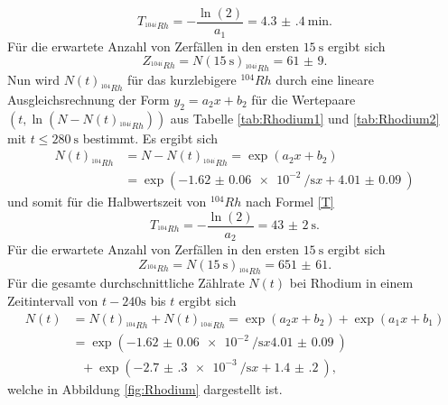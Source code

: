 \begin{equation}
	T_{^{104i}Rh} = -\frac{\ln(2)}{a_1}=\SI{4.3(4)}{\minute}\text{.}
\end{equation}
Für die erwartete Anzahl von Zerfällen in den ersten $\SI{15}{\second}$ ergibt sich
\begin{equation}
	Z_{^{104i}Rh} = N(\SI{15}{\second})_{^{104i}Rh}=\num{61(9)}\text{.}
\end{equation}
Nun wird $N(t)_{^{104}Rh}$ für das kurzlebigere $^{104} Rh$ durch eine lineare Ausgleichsrechnung der Form $y_2=a_2 x+b_2$ für die Wertepaare $(t,\ln(N-N(t)_{^{104i}Rh}))$ aus Tabelle \ref{tab:Rhodium1} und \ref{tab:Rhodium2}  mit $t\le \SI{280}{\second}$ bestimmt.
Es ergibt sich
\begin{align}
N(t)_{^{104}Rh} &= N-N(t)_{^{104i}Rh} = \exp\left(a_2 x + b_2\right) \\
 &= \exp\left(-\SI{1.62(6)e-2}{\per\second} x + \SI{4.01(9)}{}\right)
\end{align}
und somit für die Halbwertszeit von $^{104} Rh$ nach Formel \eqref{T}
\begin{equation}
T_{^{104}Rh} = -\frac{\ln(2)}{a_2}=\SI{43(2)}{\second}\text{.}
\end{equation}
Für die erwartete Anzahl von Zerfällen in den ersten $\SI{15}{\second}$ ergibt sich
\begin{equation}
Z_{^{104}Rh} = N(\SI{15}{\second})_{^{104}Rh}=\num{651(61)}\text{.}
\end{equation}
Für die gesamte durchschnittliche Zählrate $N(t)$ bei Rhodium in einem Zeitintervall von $t-240\si{\second}$ bis $t$ ergibt sich
\begin{align}
N(t)&=N(t)_{^{104}Rh}+N(t)_{^{104i}Rh} =  \exp\left(a_2 x + b_2\right)+\exp\left(a_1 x + b_1\right) \\
&= \exp\left(-\SI{1.62(6)e-2}{\per\second} x \SI{4.01(9)}{}\right) \\
&\text{ }+\exp\left(-\SI{2.7(3)e-3}{\per\second} x + \SI{1.4(2)}{}\right)\text{,}
\end{align}
welche in Abbildung \ref{fig:Rhodium} dargestellt ist.


